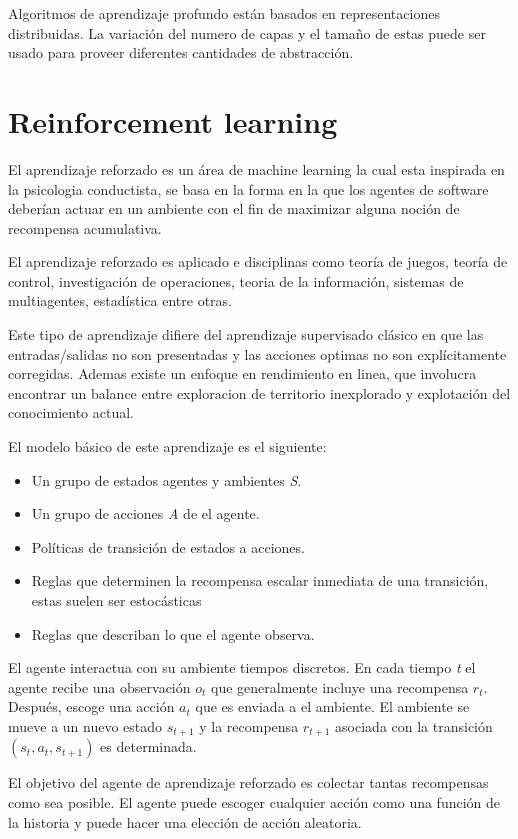 \documentclass{article}
\begin{document}
Algoritmos de aprendizaje profundo están basados en representaciones distribuidas. La variación del numero de capas y el tamaño de estas puede ser usado para proveer diferentes cantidades de abstracción.
\newpage
\section{Reinforcement learning}
El aprendizaje reforzado es un área de machine learning la cual esta inspirada en la psicologia conductista, se basa en la forma en la que los agentes de software deberían actuar en un ambiente con el fin de maximizar alguna noción de recompensa acumulativa.

El aprendizaje reforzado es aplicado e disciplinas como teoría de juegos, teoría de control, investigación de operaciones, teoria de la información, sistemas de multiagentes, estadística entre otras.

Este tipo de aprendizaje difiere del aprendizaje supervisado clásico en que las entradas/salidas no son presentadas y las acciones optimas no son explícitamente corregidas. Ademas existe un enfoque en rendimiento en linea, que involucra encontrar un balance entre exploracion de territorio inexplorado y explotación del conocimiento actual.

El modelo básico de este aprendizaje es el siguiente:
\begin{itemize}
	\item Un grupo de estados agentes y ambientes \emph{S}.
	\item Un grupo de acciones \emph{A} de el agente.
	\item Políticas de transición de estados a acciones.
	\item Reglas que determinen la recompensa escalar inmediata de una transición, estas suelen ser estocásticas
	\item Reglas que describan lo que el agente observa.
\end{itemize}

El agente interactua con su ambiente tiempos discretos. En cada tiempo \emph{t} el agente recibe una observación \emph{$o_{t}$} que generalmente incluye una recompensa \emph{$r_{t}$}. Después, escoge una acción \emph{$a_{t}$} que es enviada a el ambiente. El ambiente se mueve a un nuevo estado \emph{$s_{t+1}$} y la recompensa \emph{$r_{t+1}$} asociada con la transición \emph{$(s_{t}, a_{t}, s_{t+1})$} es determinada.

El objetivo del agente de aprendizaje reforzado es colectar tantas recompensas como sea posible. El agente puede escoger cualquier acción como una función de la historia y puede hacer una elección de acción aleatoria.
\end{document}
